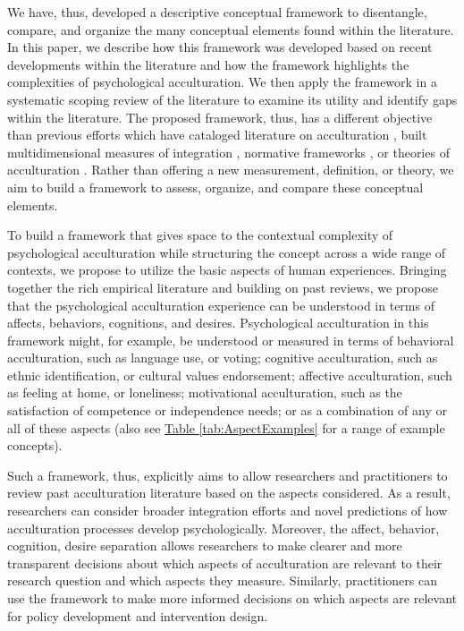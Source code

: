 \documentclass[man, 12pt, a4paper, mask]{apa7}
\newcommand{\tblref}[2][]{\hyperref[#2]{Table \ref*{#2}#1}}
\begin{document}
We have, thus, developed a descriptive conceptual framework to disentangle, compare, and organize the many conceptual elements found within the literature. In this paper, we describe how this framework was developed based on recent developments within the literature and how the framework highlights the complexities of psychological acculturation. We then apply the framework in a systematic scoping review of the literature to examine its utility and identify gaps within the literature. The proposed framework, thus, has a different objective than previous efforts which have cataloged literature on acculturation \citep[e.g.,][]{Castels2003}, built multidimensional measures of integration \citep[e.g.,][]{Harder2018}, normative frameworks \citep[e.g.,][]{Ager2008a}, or theories of acculturation \citep[e.g.,][]{Berry2005}. Rather than offering a new measurement, definition, or theory, we aim to build a framework to assess, organize, and compare these conceptual elements. 

To build a framework that gives space to the contextual complexity of psychological acculturation while structuring the concept across a wide range of contexts, we propose to utilize the basic aspects of human experiences. Bringing together the rich empirical literature and building on past reviews, we propose that the psychological acculturation experience can be understood in terms of affects, behaviors, cognitions, and desires. Psychological acculturation in this framework might, for example, be understood or measured in terms of behavioral acculturation, such as language use, or voting; cognitive acculturation, such as ethnic identification, or cultural values endorsement; affective acculturation, such as feeling at home, or loneliness; motivational acculturation, such as the satisfaction of competence or independence needs; or as a combination of any or all of these aspects (also see \tblref{tab:AspectExamples} for a range of example concepts). 

Such a framework, thus, explicitly aims to allow researchers and practitioners to review past acculturation literature based on the aspects considered. As a result, researchers can consider broader integration efforts and novel predictions of how acculturation processes develop psychologically. Moreover, the affect, behavior, cognition, desire separation allows researchers to make clearer and more transparent decisions about which aspects of acculturation are relevant to their research question and which aspects they measure. Similarly, practitioners can use the framework to make more informed decisions on which aspects are relevant for policy development and intervention design. 
\end{document}
